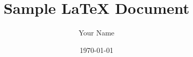 \documentclass{article}
\begin{document}
\title{Sample LaTeX Document}
\author{Your Name}
\date{\today}

\maketitle








\end{document}
